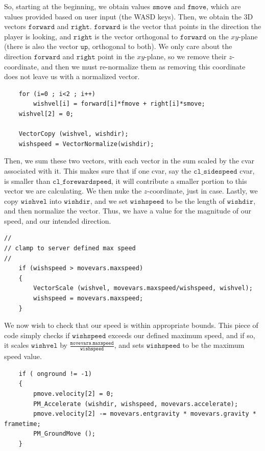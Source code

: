 \documentclass{article}
\begin{document}
So, starting at the beginning, we obtain values $\texttt{smove}$ and $\texttt{fmove}$, which are values provided based on user input (the WASD keys). Then, we obtain the 3D vectors $\texttt{forward}$ and $\texttt{right}$. $\texttt{forward}$ is the vector that points in the direction the player is looking, and $\texttt{right}$ is the vector orthogonal to $\texttt{forward}$ on the $xy$-plane (there is also the vector $\texttt{up}$, orthogonal to both). We only care about the direction $\texttt{forward}$ and $\texttt{right}$ point in the $xy$-plane, so we remove their $z$-coordinate, and then we must re-normalize them as removing this coordinate does not leave us with a normalized vector. 
\begin{verbatim}
	for (i=0 ; i<2 ; i++)
		wishvel[i] = forward[i]*fmove + right[i]*smove;
	wishvel[2] = 0;

	VectorCopy (wishvel, wishdir);
	wishspeed = VectorNormalize(wishdir);
\end{verbatim}
Then, we sum these two vectors, with each vector in the sum scaled by the cvar associated with it. This makes sure that if one cvar, say the $\texttt{cl\_sidespeed}$ cvar, is smaller than $\texttt{cl\_forewardspeed}$, it will contribute a smaller portion to this vector we are calculating. We then nuke the $z$-coordinate, just in case. Lastly, we copy $\texttt{wishvel}$ into $\texttt{wishdir}$, and we set $\texttt{wishspeed}$ to be the length of $\texttt{wishdir}$, and then normalize the vector. Thus, we have a value for the magnitude of our speed, and our intended direction. 
\begin{verbatim}
//
// clamp to server defined max speed
//
	if (wishspeed > movevars.maxspeed)
	{
		VectorScale (wishvel, movevars.maxspeed/wishspeed, wishvel);
		wishspeed = movevars.maxspeed;
	}  
\end{verbatim}
We now wish to check that our speed is within appropriate bounds. This piece of code simply checks if $\texttt{wishspeed}$ exceeds our defined maximum speed, and if so, it scales $\texttt{wishvel}$ by $\frac{\texttt{movevars.maxspeed}}{\texttt{wishspeed}}$, and sets $\texttt{wishspeed}$ to be the maximum speed value. 
\begin{verbatim}
	if ( onground != -1)
	{
		pmove.velocity[2] = 0;
		PM_Accelerate (wishdir, wishspeed, movevars.accelerate);
		pmove.velocity[2] -= movevars.entgravity * movevars.gravity * frametime;
		PM_GroundMove ();
	}
\end{verbatim}
\end{document}
